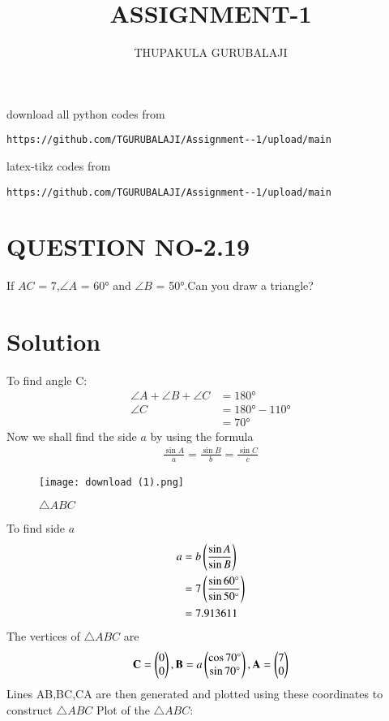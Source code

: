 \documentclass[journal,12pt,twocolumn]{IEEEtran}
\begin{document}
     \def\rightbox#1{\makebox[0in][r]{#1}}
     \def\centbox#1{\makebox[0in]{#1}}
     \def\topbox#1{\raisebox{-\baselineskip}[0in][0in]{#1}}
     \def\midbox#1{\raisebox{-0.5\baselineskip}[0in][0in]{#1}}
\vspace{3cm}
\title{ASSIGNMENT-1}
\author{THUPAKULA GURUBALAJI}
\maketitle
\newpage
\bigskip
\renewcommand{\thefigure}{\theenumi}
\renewcommand{\thetable}{\theenumi}
%
download all python codes from 
%
\begin{lstlisting}
https://github.com/TGURUBALAJI/Assignment--1/upload/main
\end{lstlisting}
%
latex-tikz codes from
%
\begin{lstlisting}
https://github.com/TGURUBALAJI/Assignment--1/upload/main
\end{lstlisting}
%
\section{QUESTION NO-2.19}
 \noindent If  $AC$ = 7,$\angle{A}$ = \ang{60} and $\angle{B}$ = \ang{50}.Can you draw a triangle?
%
\section{Solution}
To find angle C:
\begin{align}
\angle{A} + \angle{B} + \angle{C} &= \ang{180}
\\
\angle{C} &= \ang{180} - \ang{110}
\\
&= \ang{70}
\end{align}
Now we shall find the side $a$ by using the formula
\begin{align}
\frac{\sin{A}}{a} = \frac{\sin{B}}{b} = \frac{\sin{C}}{c}
\end{align}
\begin{figure}[!h]
\centering
\texttt{[image: download (1).png]}
\caption{$\triangle ABC$}
\label{fig:triangle}	
\end{figure}
To find side $a$
\begin{align}
a&= b\left(\frac{\sin{A}}{\sin{B}}\right) 
\\
&= 7 \left(\frac{\sin{\ang{60}}}{\sin{\ang{50}}}\right)
\\
&= 7.913611
\end{align}
The vertices of $\triangle ABC$ are
\begin{align}
\mathbf{C} =\begin{pmatrix}0 \\ 0\end{pmatrix},
\mathbf{B} =a\begin{pmatrix}\cos{\ang{70}} \\ \sin{\ang{70}}\end{pmatrix},
\mathbf{A} =\begin{pmatrix}7 \\ 0\end{pmatrix}
\end{align}
Lines AB,BC,CA are then generated and plotted using these coordinates to construct $\triangle ABC$
Plot of the $\triangle ABC$:
\end{document}
